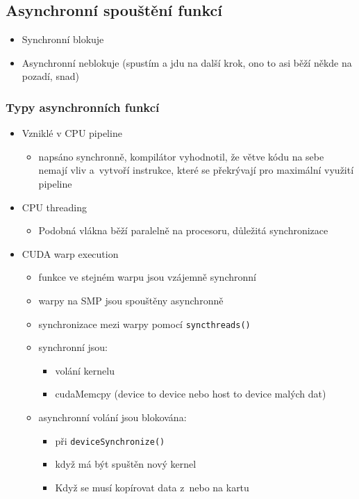 \subsection{Asynchronní spouštění funkcí}
\begin{itemize}
    \item Synchronní blokuje
    \item Asynchronní neblokuje (spustím a jdu na další krok, ono to asi běží někde na pozadí, snad)
\end{itemize}

\subsubsection{Typy asynchronních funkcí}
\begin{itemize}
    \item Vzniklé v CPU pipeline
    \begin{itemize}
        \item napsáno synchronně, kompilátor vyhodnotil, že větve kódu na sebe nemají vliv a~vytvoří instrukce, které se překrývají pro maximální využití pipeline
    \end{itemize}
    \item CPU threading
    \begin{itemize}
        \item Podobná vlákna běží paralelně na procesoru, důležitá synchronizace
    \end{itemize}
    \item CUDA warp execution
    \begin{itemize}
        \item funkce ve stejném warpu jsou vzájemně synchronní
        \item warpy na SMP jsou spouštěny asynchronně
        \item synchronizace mezi warpy pomocí \texttt{syncthreads()}
        \item synchronní jsou:
        \begin{itemize}
            \item volání kernelu
            \item cudaMemcpy (device to device nebo host to device malých dat)
        \end{itemize}
        \item asynchronní volání jsou blokována:
        \begin{itemize}
            \item při \texttt{deviceSynchronize()}
            \item když má být spuštěn nový kernel
            \item Když se musí kopírovat data z~nebo na kartu
        \end{itemize}
    \end{itemize}
\end{itemize}

